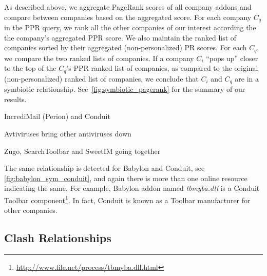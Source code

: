 \documentclass[11pt,oneside]{book}
\let\Oldsubsection\subsection
\renewcommand{\subsection}{\FloatBarrier\Oldsubsection}
\begin{document}
As described above, we aggregate PageRank scores of all company addons and compare between companies based on the aggregated score. For each company $C_q$ in the PPR query, we rank all the other companies of our interest according the the company's aggregated PPR score. We also maintain the ranked list of companies sorted by their aggregated (non-personalized) PR scores. For each $C_q$, we compare the two ranked lists of companies. If a company $C_i$ ``pops up'' closer to the top of the $C_q$'s PPR ranked list of companies, as compared to the original (non-personalized) ranked list of companies, we conclude that $C_i$ and $C_q$ are in a symbiotic relationship. See~\autoref{fig:symbiotic_pagerank} for the summary of our results.


IncrediMail (Perion) and Conduit

Avtiviruses bring other antiviruses down

Zugo, SearchToolbar and SweetIM going together

The same relationship is detected for Babylon and Conduit, see \autoref{fig:babylon_sym_conduit}, and again there is more than one online resource indicating the same. For example, Babylon addon named \emph{tbmyba.dll} is a Conduit Toolbar component\footnote{\url{http://www.file.net/process/tbmyba.dll.html}}. In fact, Conduit is known as a Toolbar manufacturer for other companies.


\subsection{Clash Relationships}
\label{sec:clash_relations}
\end{document}
